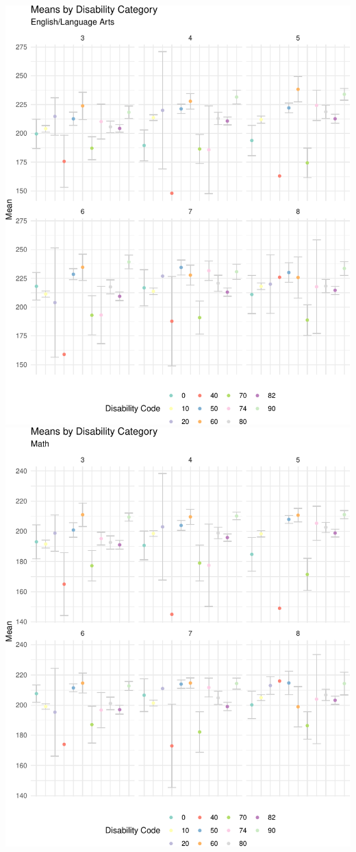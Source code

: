 \documentclass[]{article}
\begin{document}
\FloatBarrier
\includegraphics{tech_report_18_files/figure-latex/plots38-1.pdf}
\includegraphics{tech_report_18_files/figure-latex/plots38-2.pdf}
\end{document}

